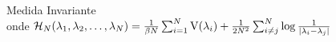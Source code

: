 \begin{frame}
\begin{minipage}[h][0.47\textheight][c]{\textwidth}
{\begin{block}{Medida Invariante}
\begin{equation*}
			\end{equation*}
				onde
				$\operatorname{\mathcal{H}}_N(\lambda_1, \lambda_2, \dots, \lambda_N) = \frac{1}{\beta N} \sum_{i=1}^N \operatorname{V}(\lambda_i) + \frac{1}{2N^2} \sum_{i \neq j}^{N}  \log \frac{1}{|\lambda_i - \lambda_j|}$
		\end{block}
		}
	\end{minipage}
	
\end{frame}


